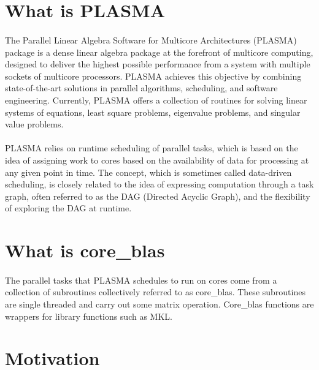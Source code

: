 \documentclass{article}
\begin{document}
\section{What is PLASMA}
\paragraph{}
The Parallel Linear Algebra Software for Multicore Architectures (PLASMA) package is a dense linear algebra package at the forefront of multicore computing, designed to deliver the highest possible performance from a system with multiple sockets of multicore processors. PLASMA achieves this objective by combining state-of-the-art solutions in parallel algorithms, scheduling, and software engineering. Currently, PLASMA offers a collection of routines for solving linear systems of equations, least square problems, eigenvalue problems, and singular value problems.
\paragraph{}
PLASMA relies on runtime scheduling of parallel tasks, which is based on the idea of assigning work to cores based on the availability of data for processing at any given point in time. The concept, which is sometimes called data-driven scheduling, is closely related to the idea of expressing computation through a task graph, often referred to as the DAG (Directed Acyclic Graph), and the flexibility of exploring the DAG at runtime.

\section{What is core\_blas}
\paragraph{}
The parallel tasks that PLASMA schedules to run on cores come from a collection of subroutines collectively referred to as core\_blas. These subroutines are single threaded and carry out some matrix operation. Core\_blas functions are wrappers for library functions such as MKL.

\section{Motivation}
\end{document}
